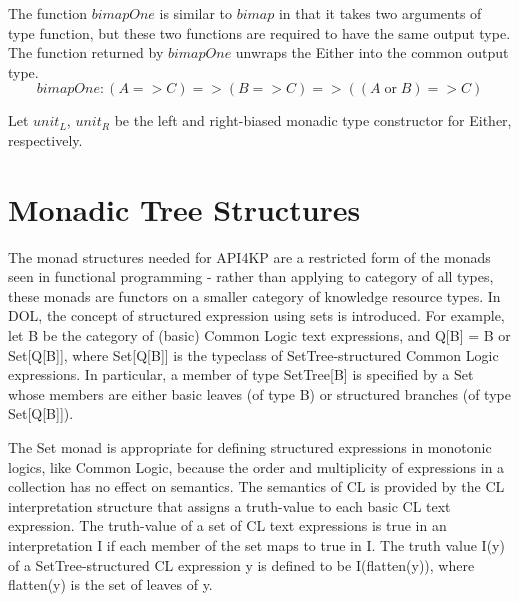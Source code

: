 \documentclass[runningheads]{llncs}
\begin{document}
The function $bimapOne$ is similar to $bimap$ in that it takes two arguments of type function, but these two functions are required to have the same output type. The function returned by $bimapOne$ unwraps the Either into the common output type.
$$bimapOne: (A=>C) => (B=>C) => ((A \mathop{\mathrm{or}} B)=> C)$$
 
 Let $unit_L$, $unit_R$ be the left and right-biased monadic type constructor for Either, respectively.






\section{Monadic Tree Structures}
The monad structures needed for API4KP are a restricted form of the monads seen in functional programming - rather than applying to category of all types, these monads are functors on a smaller category of knowledge resource types. In DOL, the concept of structured expression using sets is introduced. For example, let B be the category of (basic) Common Logic text expressions, and Q[B] = B or Set[Q[B]], where Set[Q[B]] is the typeclass of SetTree-structured Common Logic expressions. In particular, a member of type SetTree[B] is specified by a Set whose members are either  basic leaves (of type B) or structured branches (of type Set[Q[B]]). 

The Set monad is appropriate for defining structured expressions in monotonic logics, like Common Logic, because the order and multiplicity of expressions in a collection has no effect on semantics. The semantics of CL is provided by the CL interpretation structure that assigns a truth-value to each basic CL text expression. The truth-value of a set of CL text expressions is true in an interpretation I if each member of the set maps to true in I. The truth value I(y) of a SetTree-structured CL expression y is defined to be I(flatten(y)), where flatten(y) is the set of leaves of y.
\end{document}
